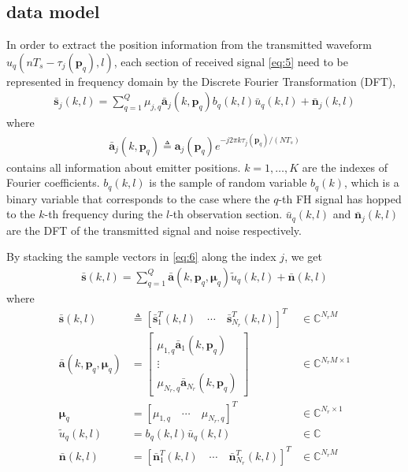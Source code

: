 \documentclass[journal,10pt]{IEEEtran}
\begin{document}
\subsection{data model}
In order to extract the position information from the transmitted waveform $u_q(nT_s-\tau_j(\boldsymbol{p}_q),l)$, 
each section of received signal \eqref{eq:5} need to be represented in frequency domain by the Discrete Fourier Transformation (DFT), 
\begin{align}\label{eq:8}
    \bar{\boldsymbol{s}}_j(k,l)=\sum_{q=1}^Q  \mu_{j,q}\bar{\boldsymbol{a}}_j(k,\boldsymbol{p}_q) b_q(k,l)\bar{u}_q(k,l)+\bar{\boldsymbol{n}}_j(k,l)
\end{align}
where 
\begin{align}\label{eq:9}
    \bar{\boldsymbol{a}}_j(k,\boldsymbol{p}_q)\triangleq \boldsymbol{a}_j(\boldsymbol{p}_q)e^{-j2\pi k\tau_j(\boldsymbol{p}_q)/(NT_s)}
\end{align}
contains all information about emitter positions.
$k=1,\dots,K$ are the indexes of Fourier coefficients. $b_q(k,l)$ is the sample of random variable $b_q(k)$, which is a binary variable that corresponds to the case 
where the $q$-th FH signal has hopped to the $k$-th frequency during the $l$-th observation section. 
$\bar{u}_q(k,l)$ and $\bar{\boldsymbol{n}}_j(k,l)$ are the DFT of the transmitted signal and noise respectively.

By stacking the sample vectors in \eqref{eq:6} along the index $j$, we get
\begin{align}\label{eq:10}
    \bar{\boldsymbol{s}}(k,l)=\sum_{q=1}^Q \bar{\boldsymbol{a}}(k,\boldsymbol{p}_q,\boldsymbol{\mu}_{q}) \tilde{u}_q(k,l) +\bar{\boldsymbol{n}}(k,l)
\end{align}
where 
\begin{align*}
    \bar{\boldsymbol{s}}(k,l)&\triangleq[\bar{\boldsymbol{s}}_1^T(k,l)\quad  \cdots \quad \bar{\boldsymbol{s}}_{N_r}^T(k,l)]^T &\in \mathbb{C}^{N_rM }\\
    \bar{\boldsymbol{a}}(k,\boldsymbol{p}_q,\boldsymbol{\mu}_{q})&=\left[
     \begin{array}{c}
        \mu_{1,q}\bar{\boldsymbol{a}}_1(k,\boldsymbol{p}_q)\\
        \vdots\\
        \mu_{N_r,q}\bar{\boldsymbol{a}}_{N_r}(k,\boldsymbol{p}_q)
     \end{array}
        \right]&\in \mathbb{C}^{N_rM\times 1}\\
    \boldsymbol{\mu}_{q}&=[\mu_{1,q} \quad \cdots \quad \mu_{N_r,q}]^T &\in \mathbb{C}^{N_r\times 1} \\ 
    \tilde{u}_q(k,l)&=b_q(k,l)\bar{u}_q(k,l)&\in \mathbb{C}\\
    \bar{\boldsymbol{n}}(k,l)&=[\bar{\boldsymbol{n}}_1^T(k,l)\quad \cdots \quad \bar{\boldsymbol{n}}_{N_r}^T(k,l)]^T &\in \mathbb{C}^{N_rM}
\end{align*}
\end{document}
